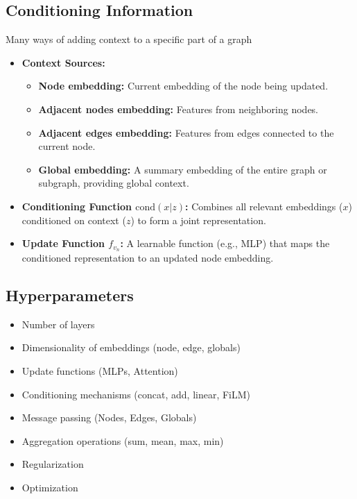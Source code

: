 \newpage

\subsection{Conditioning Information}
\begin{notes}
    Many ways of adding context to a specific part of a graph \\
    \begin{itemize}    
        \item \textbf{Context Sources:}
        \begin{itemize}
            \item \textbf{Node embedding:} Current embedding of the node being updated.
            \item \textbf{Adjacent nodes embedding:} Features from neighboring nodes.
            \item \textbf{Adjacent edges embedding:} Features from edges connected to the current node.
            \item \textbf{Global embedding:} A summary embedding of the entire graph or subgraph, providing global context.
        \end{itemize}
    
        \item \textbf{Conditioning Function \(\text{cond}(x|z)\):} Combines all relevant embeddings (\(x\)) conditioned on context (\(z\)) to form a joint representation.
    
        \item \textbf{Update Function \(f_{v_n}\):} A learnable function (e.g., MLP) that maps the conditioned representation to an updated node embedding.
    \end{itemize}    
\end{notes}

\subsection{Hyperparameters}
\begin{notes}
    \begin{itemize}
        \item Number of layers
        \item Dimensionality of embeddings (node, edge, globals)
        \item Update functions (MLPs, Attention)
        \item Conditioning mechanisms (concat, add, linear, FiLM)
        \item Message passing (Nodes, Edges, Globals)
        \item Aggregation operations (sum, mean, max, min)
        \item Regularization
        \item Optimization
    \end{itemize}
\end{notes}
\newpage

